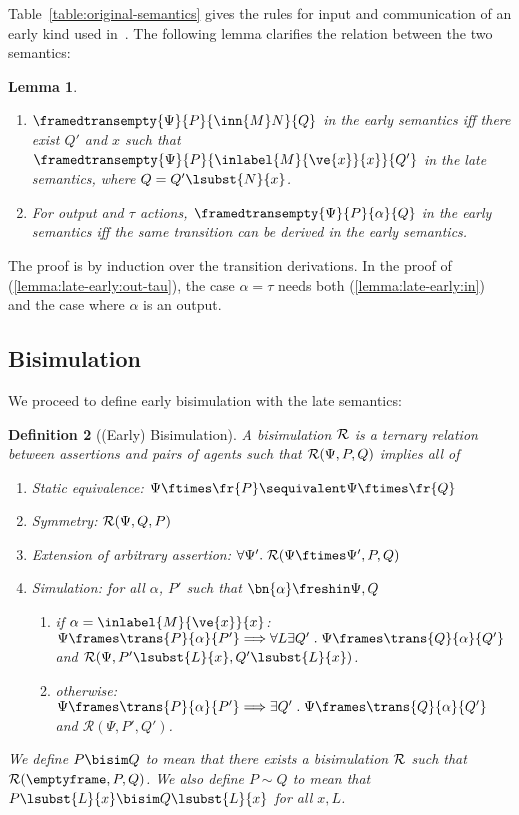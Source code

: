 \documentclass{eptcs}
\newtheorem{definition}{Definition}
\newtheorem{lemma}[definition]{Lemma}
\theoremstyle{definition}
\begin{document}
Table~\ref{table:original-semantics} gives the rules for
input and communication
of an early kind used in~\cite{bengtson.johansson.ea:psi-calculi}.
The following lemma clarifies the relation between the two semantics:
\begin{lemma}
\ 
\label{lemma:late-early}
\begin{enumerate}
\item \label{lemma:late-early:in}
$\framedtransempty{\Psi}{P}{\inn{M}N}{Q}$ in the early semantics iff there exist
$Q'$ and $x$ such that
$\framedtransempty{\Psi}{P}{\inlabel{M}{\ve{x}}{x}}{Q'}$ in the late semantics,
where $Q=Q'\lsubst{N}{x}$.
\item \label{lemma:late-early:out-tau}
For output and $\tau$ actions, $\framedtransempty{\Psi}{P}{\alpha}{Q}$ in the early semantics iff the same transition can be derived in the early semantics.
\end{enumerate}
\end{lemma}
The proof is by induction over the transition derivations. In the proof of (\ref{lemma:late-early:out-tau}), the case $\alpha=\tau$ needs both (\ref{lemma:late-early:in}) and the case where $\alpha$ is an output.

\subsection{Bisimulation}
We proceed to define early bisimulation with the late semantics:

\begin{definition}[(Early) Bisimulation]
A {\em bisimulation}
 $\cal R$ is a ternary relation between assertions and pairs of agents such that
 ${\cal R}(\Psi,P,Q)$ implies all of
 \begin{enumerate}
 \item Static equivalence:
  $\Psi \ftimes \fr{P} \sequivalent \Psi \ftimes \fr{Q}$
 \item
   Symmetry: ${\cal R}(\Psi,Q,P)$
 \item
 Extension of arbitrary assertion: $\forall \Psi'.\; {\cal
R}(\Psi \ftimes
\Psi',P,Q)$
 \item
  Simulation: for all $\alpha$, $P'$ such that $\bn{\alpha} \freshin \Psi, Q$
\begin{enumerate}
\item if $\alpha = \inlabel{M}{\ve{x}}{x}$:\quad $\Psi \frames
\trans{P}{\alpha}{P'} \Longrightarrow\\ \forall L \exists Q'\; .\; \Psi
\frames
\trans{Q}{\alpha}{Q'}$ and
$\mathcal{R}(\Psi,P'\lsubst{L}{x},Q'\lsubst{L}{x})$.
\item otherwise: \quad $\Psi \frames \trans{P}{\alpha}{P'} \Longrightarrow
\exists Q'\; .\; \Psi \frames \trans{Q}{\alpha}{Q'}$ and
$\mathcal{R}(\Psi,P',Q')$.
\end{enumerate}
\end{enumerate}
 \label{def:bisim}
We define $P \bisim Q$ to mean that there exists a bisimulation ${\cal R}$ such
that
${\cal R}(\emptyframe,P,Q)$. We also define $P \sim Q$ to mean that
$P\lsubst{L}{x} \bisim
Q\lsubst{L}{x}$ for all $x, L$.
\end{definition}
\end{document}

